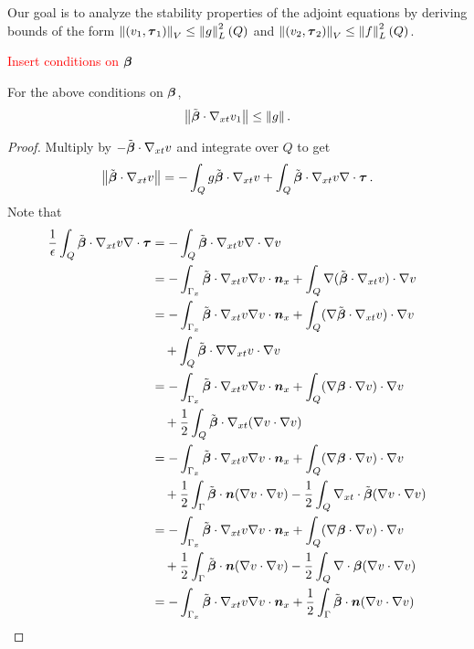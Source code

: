 \documentclass{article}
\begin{document}
Our goal is to analyze the stability properties of the adjoint equations by deriving bounds of the form
$\left\| (v_1,\boldsymbol\tau_1) \right\|_V\leq\left\| g \right\|_L^2\left( Q \right)$ and $\left\| (v_2,\boldsymbol\tau_2) \right\|_V\leq\left\| f \right\|_L^2\left( Q \right)$.

\textcolor{red}{Insert conditions on $\boldsymbol\beta$}
\begin{lemma}
\label{lem:convective}
For the above conditions on $\boldsymbol\beta$,
\[
\left\| \tilde{\boldsymbol\beta}\cdot\nabla_{xt} v_1 \right\|\leq \left\| g \right\|.
\]
\end{lemma}
\begin{proof}
Multiply by $-\tilde{\boldsymbol\beta}\cdot\nabla_{xt} v$ and integrate over $Q$ to get
\begin{equation}
\label{eq:adj1}
\left\| \tilde{\boldsymbol\beta}\cdot\nabla_{xt} v \right\|=-\int_Q g\tilde{\boldsymbol\beta}\cdot\nabla_{xt} v+\int_Q\tilde{\boldsymbol\beta}\cdot\nabla_{xt} v\nabla\cdot\boldsymbol\tau\,.
\end{equation}
Note that
\begin{align*}
\frac{1}{\epsilon}\int_Q\tilde\bfbeta\cdot\Gradxt v\Div\bftau&=-\int_Q\tilde\bfbeta\cdot\Gradxt v\Div\Grad v \\
%
&=-\int_{\Gamma_x}\tilde\bfbeta\cdot\Gradxt v\Grad v\cdot\bfn_x
+\int_Q\Grad(\tilde\bfbeta\cdot\Gradxt v)\cdot\Grad v \\
%
&=-\int_{\Gamma_x}\tilde\bfbeta\cdot\Gradxt v\Grad v\cdot\bfn_x
+\int_Q(\Grad\tilde\bfbeta\cdot\Gradxt v)\cdot\Grad v\\
&\quad+\int_Q\tilde\bfbeta\cdot\Grad\Gradxt v\cdot\Grad v\\
%
&=-\int_{\Gamma_x}\tilde\bfbeta\cdot\Gradxt v\Grad v\cdot\bfn_x
+\int_Q(\Grad\bfbeta\cdot\Grad v)\cdot\Grad v\\
&\quad+\frac{1}{2}\int_Q\tilde\bfbeta\cdot\Gradxt(\Grad v\cdot\Grad v)\\
%
&=-\int_{\Gamma_x}\tilde\bfbeta\cdot\Gradxt v\Grad v\cdot\bfn_x
+\int_Q(\Grad\bfbeta\cdot\Grad v)\cdot\Grad v\\
&\quad+\frac{1}{2}\int_\Gamma\tilde\bfbeta\cdot\bfn(\Grad v\cdot\Grad v)
-\frac{1}{2}\int_Q\Divxt\tilde\bfbeta(\Grad v\cdot\Grad v)\\
%
&=-\int_{\Gamma_x}\tilde\bfbeta\cdot\Gradxt v\Grad v\cdot\bfn_x
+\int_Q(\Grad\bfbeta\cdot\Grad v)\cdot\Grad v\\
&\quad+\frac{1}{2}\int_\Gamma\tilde\bfbeta\cdot\bfn(\Grad v\cdot\Grad v)
-\frac{1}{2}\int_Q\Div\bfbeta(\Grad v\cdot\Grad v)\\
%
&=-\int_{\Gamma_x}\tilde\bfbeta\cdot\Gradxt v\Grad v\cdot\bfn_x
+\frac{1}{2}\int_\Gamma\tilde\bfbeta\cdot\bfn(\Grad v\cdot\Grad v)\\

\end{align*}
\end{proof}
\end{document}
